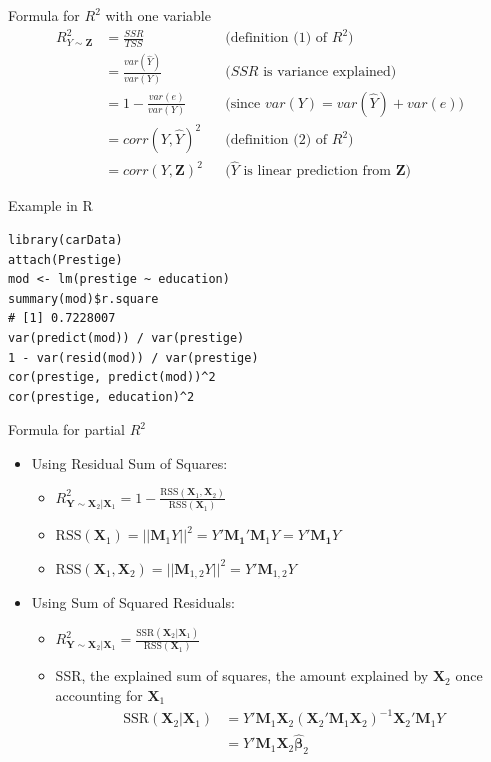 \documentclass[aspectratio=169, handout, t]{beamer}
\numberwithin{equation}{section}
\begin{document}
\begin{frame}{Formula for $R^2$ with one variable}
\begin{align*}
R^2_{Y\sim \bm{Z}} &= \frac{SSR}{TSS} &&\text{(definition (1) of $R^2$)}\\[10pt]
&= \frac{var(\hat{Y})}{var(Y)} &&\text{($SSR$ is variance explained)}\\[10pt]
&= 1 - \frac{var(e)}{var(Y)} &&\text{(since $var(Y)=var(\hat{Y})+var(e)$)}\\[10pt]
&= corr(Y, \hat{Y})^2 &&\text{(definition (2) of $R^2$)}\\[10pt]
&= corr(Y, \bm{Z})^2 &&\text{($\hat{Y}$ is linear prediction from $\bm{Z}$)}
\end{align*}

\end{frame}


\begin{frame}[fragile]{Example in R}
\begin{lstlisting}
library(carData)
attach(Prestige)
mod <- lm(prestige ~ education)
summary(mod)$r.square
# [1] 0.7228007
var(predict(mod)) / var(prestige) 
1 - var(resid(mod)) / var(prestige) 
cor(prestige, predict(mod))^2
cor(prestige, education)^2
\end{lstlisting}

\end{frame}


\begin{frame}{Formula for partial $R^2$}
\begin{itemize}
\item Using Residual Sum of Squares:
\begin{itemize}
\item $R^2_{\bm{Y}\sim \bm{X}_2|\bm{X}_1}=1-\frac{\text{RSS}(\bm{X}_1,\bm{X}_2)}{\text{RSS}(\bm{X}_1)}$
\item $\text{RSS}(\bm{X}_1)=||\bm{M}_1Y||^2=Y'\bm{M_1}'\bm{M}_1Y=Y'\bm{M_1}Y$
\item $\text{RSS}(\bm{X}_{1},\bm{X}_2)=||\bm{M}_{1,2}Y||^2=Y'\bm{M}_{1,2}Y$
\end{itemize}\pause
\item Using Sum of Squared Residuals:
\begin{itemize}
\item $R^2_{\bm{Y}\sim \bm{X}_2|\bm{X}_1}=\frac{\text{SSR}(\bm{X}_2|\bm{X}_1)}{\text{RSS}(\bm{X}_1)}$
\item SSR, the explained sum of squares, the amount explained by $\bm{X}_2$ once accounting for $\bm{X}_1$
\begin{align*}
\text{SSR}(\bm{X}_2|\bm{X}_1)&=Y'\bm{M}_1\bm{X}_2(\bm{X}_2'\bm{M}_1\bm{X}_2)^{-1}\bm{X}_2'\bm{M}_1Y\\
&=Y'\bm{M}_1\bm{X}_2\bm{\hat{\beta}}_2
\end{align*}
\end{itemize}
\end{itemize}
\end{frame}
\end{document}
